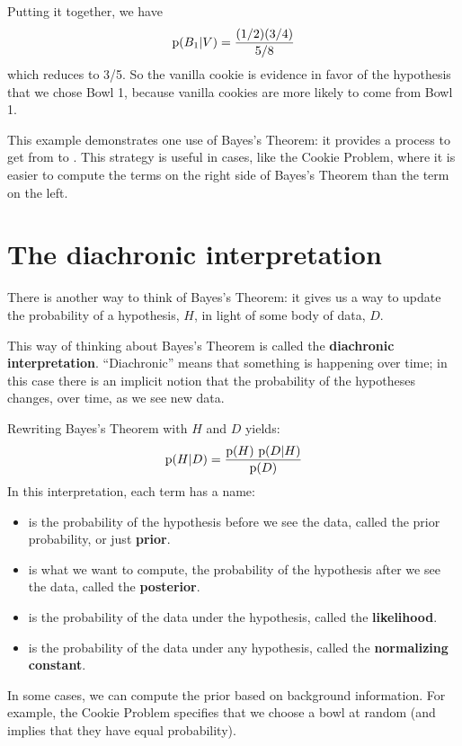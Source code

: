 \documentclass[12pt]{book}
\begin{document}
Putting it together, we have 
%
\[ \mathrm{p}(B_1|V) = \frac{(1/2)(3/4)}{5/8} \]
%
which reduces to 3/5.  So the vanilla cookie is evidence in favor of
the hypothesis that we chose Bowl 1, because vanilla cookies are more
likely to come from Bowl 1.

This example demonstrates one use of Bayes's Theorem: it provides
a process to get from  to .  This strategy is useful
in cases, like the Cookie Problem, where it is easier to compute
the terms on the right side of Bayes's Theorem than the term on the
left.


\section{The diachronic interpretation}

There is another way to think of Bayes's Theorem: it gives us a
way to update the probability of a hypothesis, $H$, in light of
some body of data, $D$.

This way of thinking about Bayes's Theorem is called the
{\bf diachronic interpretation}.  ``Diachronic'' means that something
is happening over time; in this case there is an implicit notion
that the probability of the hypotheses changes, over time, as
we see new data.

Rewriting Bayes's Theorem with $H$ and $D$ yields:
%
\[ \mathrm{p}(H|D) = \frac{\mathrm{p}(H)~\mathrm{p}(D|H)}{\mathrm{p}(D)} \]
%
In this interpretation, each term has a name:

\begin{itemize}

\item {} is the probability of the hypothesis before we see
the data, called the prior probability, or just {\bf prior}.

\item {} is what we want to compute, the probability of
the hypothesis after we see the data, called the {\bf posterior}.
 
\item {} is the probability of the data under the hypothesis,
called the {\bf likelihood}.

\item {} is the probability of the data under any hypothesis,
called the {\bf normalizing constant}.

\end{itemize}

In some cases, we can compute the prior
based on background information.  For example, the Cookie
Problem specifies that we choose a bowl at random (and implies
that they have equal probability).
\end{document}
